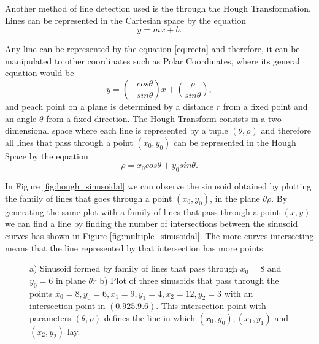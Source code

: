 Another method of line detection used is the through the Hough Transformation\cite{illingworth1988survey}. Lines can be represented in the Cartesian space by the equation
\begin{equation}
	y=mx+b.
	\label{eq:recta}
\end{equation}

Any line can be represented by the equation \ref{eq:recta} and therefore, it can be manipulated to other coordinates such as Polar Coordinates, where its general equation would be
\begin{equation}
	y=\left( -\frac{cos \theta}{sin \theta} \right) x + \left(\frac{\rho}{sin \theta}\right),
\end{equation}
and peach point on a plane is determined by a distance $r$ from a fixed point and an angle $\theta$ from a fixed direction.
The Hough Transform consists in a two-dimensional space where each line is represented by a tuple $(\theta,\rho)$ and therefore all lines that pass through a point $(x_{0}, y_{0})$ can be represented in the Hough Space by the equation
\begin{equation}
\rho = x_{0}cos\theta + y_{0}sin\theta.
\label{eq:hough_eq}
\end{equation}

In Figure \ref{fig:hough_sinusoidal} we can observe the sinusoid obtained by plotting the family of lines that goes through a point $(x_{0}, y_{0})$, in the plane $\theta \rho$. By generating the same plot with a family of lines that pass through a point $(x, y)$ we can find a line by finding the number of intersections between the sinusoid curves has shown in Figure \ref{fig:multiple_sinusoidal}. The more curves intersecting means that the line represented by that intersection has more points\cite{OCV}.
\begin{figure}[htbp]
	\centering
  \caption{a) Sinusoid formed by family of lines that pass through $x_{0} =8$ and $y_{0} = 6$ in plane $\theta r$ b) Plot of three sinusoids that pass through the points $x_{0} = 8,y_{0} = 6, x_{1} = 9,y_{1} = 4, x_{2} = 12, y_{2} = 3$ with an intersection point in $(0.925.9.6)$. This intersection point with parameters $(\theta,\rho)$ defines the line in which $(x_{0},y_{0}), (x_{1},y_{1})$ and $(x_{2},y_{2})$ lay\cite{OCV}.}
\end{figure}

